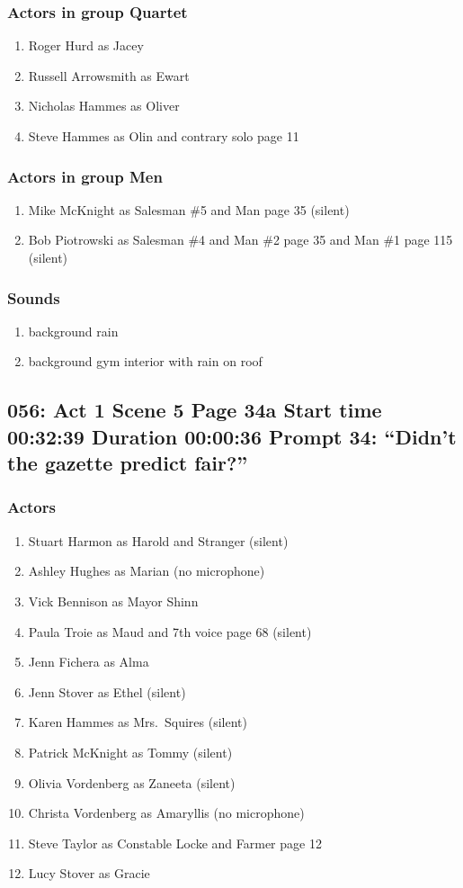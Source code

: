 \subsubsection{Actors in group Quartet}
\begin{enumerate}
\item Roger Hurd as Jacey
\item Russell Arrowsmith as Ewart
\item Nicholas Hammes as Oliver
\item Steve Hammes as Olin and contrary solo page 11
\end{enumerate}
\subsubsection{Actors in group Men}
\begin{enumerate}
\item Mike McKnight as Salesman \#5 and Man page 35 (silent)
\item Bob Piotrowski as Salesman \#4 and Man \#2 page 35 and Man \#1 page 115 (silent)
\end{enumerate}

\subsubsection{Sounds}
\begin{enumerate}
\item background rain
\item background gym interior with rain on roof
\end{enumerate}
\subsection{056: Act 1 Scene 5 Page 34a Start time 00:32:39 Duration 00:00:36 Prompt 34: ``Didn't the gazette predict fair?''}

\subsubsection{Actors}
\begin{enumerate}
\item Stuart Harmon as Harold and Stranger (silent)
\item Ashley Hughes as Marian (no microphone)
\item Vick Bennison as Mayor Shinn
\item Paula Troie as Maud and 7th voice page 68 (silent)
\item Jenn Fichera as Alma
\item Jenn Stover as Ethel (silent)
\item Karen Hammes as Mrs.~Squires (silent)
\item Patrick McKnight as Tommy (silent)
\item Olivia Vordenberg as Zaneeta (silent)
\item Christa Vordenberg as Amaryllis (no microphone)
\item Steve Taylor as Constable Locke and Farmer page 12
\item Lucy Stover as Gracie
\end{enumerate}
